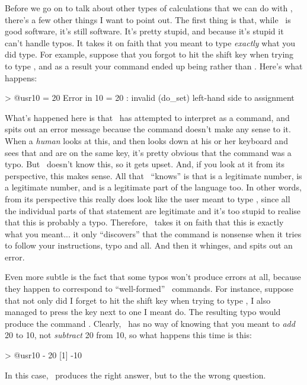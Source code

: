 Before we go on to talk about other types of calculations that we can do with \R, there's a few other things I want to point out. The first thing is that, while \R\ is good software, it's still software. It's pretty stupid, and because it's stupid it can't handle typos. It takes it on faith that you meant to type {\it exactly} what you did type. For example, suppose that you forgot to hit the shift key when trying to type \rtext{+}, and as a result your command ended up being  rather than . Here's what happens:
\begin{rblock1}
> @usr{10 = 20}
Error in 10 = 20 : invalid (do_set) left-hand side to assignment
\end{rblock1}
What's happened here is that \R\ has attempted to interpret  as a command, and spits out an error message because the command doesn't make any sense to it. When a {\it human} looks at this, and then looks down at his or her keyboard and sees that \rtext{+} and \rtext{=} are on the same key, it's pretty obvious that the command was a typo. But \R\ doesn't know this, so it gets upset. And, if you look at it from its perspective, this makes sense. All that \R\ ``knows'' is that  is a legitimate number,  is a legitimate number, and \rtext{=} is a legitimate part of the language too. In other words, from its perspective this really does look like the user meant to type , since all the individual parts of that statement are legitimate and it's too stupid to realise that this is probably a typo. Therefore, \R\ takes it on faith that this is exactly what you meant... it only ``discovers'' that the command is nonsense when it tries to follow your instructions, typo and all. And then it whinges, and spits out an error.

Even more subtle is the fact that some typos won't produce errors at all, because they happen to correspond to ``well-formed'' \R\ commands. For instance, suppose that not only did I forget to hit the shift key when trying to type , I also managed to press the key next to one I meant do. The resulting typo would produce the command . Clearly, \R\ has no way of knowing that you meant to {\it add} 20 to 10, not {\it subtract} 20 from 10, so what happens this time is this:
\begin{rblock1}
> @usr{10 - 20}
[1] -10
\end{rblock1}
In this case, \R\ produces the right answer, but to the the wrong question. 

